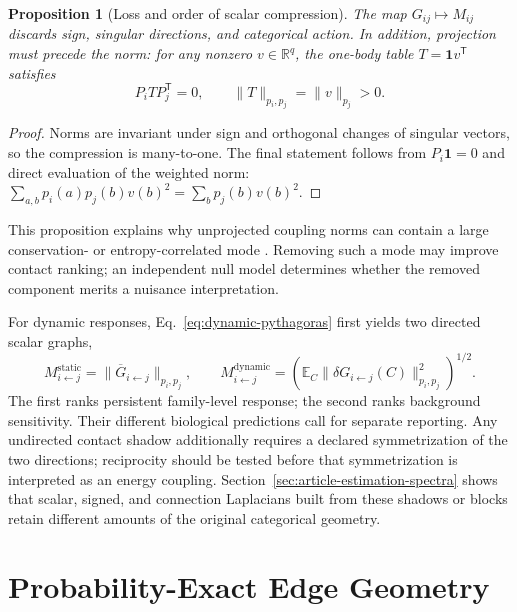 \documentclass[10pt]{article}
\newcommand{\E}{\mathbb E}
\newcommand{\R}{\mathbb R}
\newtheorem{proposition}[theorem]{Proposition}
\theoremstyle{definition}
\theoremstyle{remark}
\newcommand{\BookChapter}[1]{\section{#1}}
\newcommand{\BookInsert}[1]{}
\newcommand{\BookChapterLabel}[1]{}
\newcommand{\BookSpectralPointer}{Section~\ref{sec:article-estimation-spectra}}
\begin{document}
\begin{proposition}[Loss and order of scalar compression]
\label{prop:scalar-loss}
The map $G_{ij}\mapsto M_{ij}$ discards sign, singular directions, and categorical action.  In
addition, projection must precede the norm: for any nonzero $v\in\R^q$, the one-body table
$T=\mathbf1v^{\mathsf T}$ satisfies
\begin{equation}
P_iTP_j^{\mathsf T}=0,
\qquad
\|T\|_{p_i,p_j}=\|v\|_{p_j}>0.
\label{eq:one-body-weighted-norm}
\end{equation}
\end{proposition}

\begin{proof}
Norms are invariant under sign and orthogonal changes of singular vectors, so the compression is
many-to-one.  The final statement follows from $P_i\mathbf1=0$ and direct evaluation of the
weighted norm:
$\sum_{a,b}p_i(a)p_j(b)v(b)^2=\sum_bp_j(b)v(b)^2$.
\end{proof}

\BookInsert{chapters/05_same_shadow_example}

This proposition explains why unprojected coupling norms can contain a large conservation- or
entropy-correlated mode \cite{wang2024}.  Removing such a mode may improve contact ranking; an
independent null model determines whether the removed component merits a nuisance interpretation.

For dynamic responses, Eq.~\ref{eq:dynamic-pythagoras} first yields two directed scalar graphs,
\begin{equation}
M_{i\leftarrow j}^{\mathrm{static}}
=\|\overline G_{i\leftarrow j}\|_{p_i,p_j},
\qquad
M_{i\leftarrow j}^{\mathrm{dynamic}}
=\left(\E_C\|\delta G_{i\leftarrow j}(C)\|_{p_i,p_j}^2\right)^{1/2}.
\label{eq:two-shadows}
\end{equation}
The first ranks persistent family-level response; the second ranks background sensitivity.  Their
different biological predictions call for separate reporting.  Any
undirected contact shadow additionally requires a declared symmetrization of the two directions;
reciprocity should be tested before that symmetrization is interpreted as an energy coupling.
\BookSpectralPointer{} shows that scalar, signed, and connection Laplacians built from these shadows or blocks
retain different amounts of the original categorical geometry.

\BookInsert{chapters/05_coda}
\BookChapter{Probability-Exact Edge Geometry}
\BookChapterLabel{chap:book-probability-geometry}
\BookInsert{chapters/06_opening}
\BookInsert{chapters/06_two_state_scaling_example}
\end{document}
